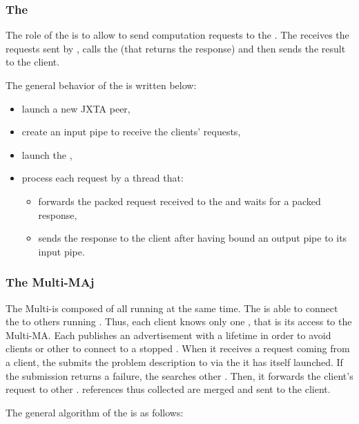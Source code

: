 \subsubsection{The \sedj}
\label{sssec:jxtased}

The role of the \sedj is to allow \clientsj to send computation requests to the
\seddiet. The \seddiet receives the requests sent by \clientsj, calls the
\seddiet (that returns the response) and then sends the result to the client.

The general behavior of the \sedj is written below:

\begin{itemize}
  
\item{launch a new JXTA peer,}
\item{create an input pipe to receive the clients' requests,}
\item{launch the \seddiet,}
\item{process each request by a thread that:
\begin{itemize}
\item{forwards the packed request received to the \seddiet and waits for a
  packed response,}
\item{sends the response to the client after having bound an output pipe to its
  input pipe.}
\end {itemize}}
\end{itemize}

\subsubsection{The Multi-MAj}
\label{sssec:jxtamultima}

The Multi-\MAj is composed of all \MAsj running at the same time. The \MAj is
able to connect the \clientsj to others running \MAsj. Thus, each client knows
only one \MAj, that is its access to the Multi-MA. Each \MAj publishes an
advertisement with a lifetime in order to avoid clients or other \MAj to
connect to a stopped \MAj. When it receives a request coming from a client, the
\MAj submits the problem description to \diet via the \MAdiet it has itself
launched. If the submission returns a \diet failure, the \MAj searches other
\MAsj. Then, it forwards the client's request to other \MAsj. \sed references
thus collected are merged and sent to the client.

The general algorithm of the \MAj is as follows:

